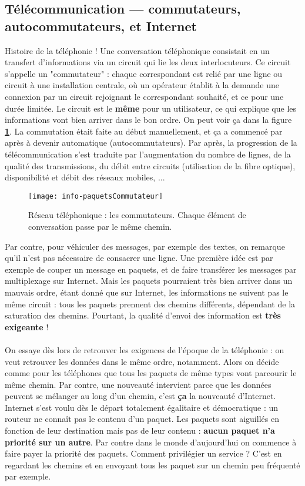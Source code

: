 \documentclass[12pt,a4paper]{report}
\begin{document}
\subsection{Télécommunication --- commutateurs, autocommutateurs, et Internet}
Histoire de la téléphonie ! Une conversation téléphonique consistait en un transfert d'informations via un circuit qui lie les deux interlocuteurs. Ce circuit s'appelle un "commutateur" : chaque correspondant est relié par une ligne ou circuit à une installation centrale, où un opérateur établit à la demande une connexion par un circuit rejoignant le correspondant souhaité, et ce pour une durée limitée. Le circuit est le \textbf{même} pour un utilisateur, ce qui explique que les informations vont bien arriver dans le bon ordre. On peut voir ça dans la figure \textbf{\ref{fig:commutateurs}}. La commutation était faite au début manuellement, et ça a commencé par après à devenir automatique (autocommutateurs). Par après, la progression de la télécommunication s'est traduite par l'augmentation du nombre de lignes, de la qualité des transmissions, du débit entre circuits (utilisation de la fibre optique), disponibilité et débit des réseaux mobiles, ...\\
\begin{figure}[h!]
\centering
\texttt{[image: info-paquetsCommutateur]}
\caption{Réseau téléphonique : les commutateurs. Chaque élément de conversation passe par le même chemin.}
\label{fig:commutateurs}
\end{figure}
Par contre, pour véhiculer des messages, par exemple des textes, on remarque qu'il n'est pas nécessaire de consacrer une ligne. Une première idée est par exemple de couper un message en paquets, et de faire transférer les messages par multiplexage sur Internet. Mais les paquets pourraient très bien arriver dans un mauvais ordre, étant donné que sur Internet, les informations ne suivent pas le même circuit : tous les paquets prennent des chemins différents, dépendant de la saturation des chemins. Pourtant, la qualité d'envoi des information est \textbf{très exigeante} !\\
\\
On essaye dès lors de retrouver les exigences de l'époque de la téléphonie : on veut retrouver les données dans le même ordre, notamment. Alors on décide comme pour les téléphones que tous les paquets de même types vont parcourir le même chemin. Par contre, une nouveauté intervient parce que les données peuvent se mélanger au long d'un chemin, c'est \textbf{ça} la nouveauté d'Internet. Internet s'est voulu dès le départ totalement égalitaire et démocratique : un routeur ne connaît pas le contenu d'un paquet. Les paquets sont aiguillés en fonction de leur destination mais pas de leur contenu : \textbf{aucun paquet n'a priorité sur un autre}. Par contre dans le monde d'aujourd'hui on commence à faire payer la priorité des paquets. Comment privilégier un service ? C'est en regardant les chemins et en envoyant tous les paquet sur un chemin peu fréquenté par exemple.
\end{document}
